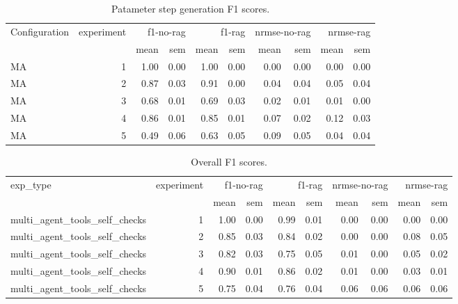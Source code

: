 \documentclass[sn-nature, twocolumn]{sn-jnl}%
\theoremstyle{thmstyleone}%
\theoremstyle{thmstyletwo}%
\theoremstyle{thmstylethree}%
\begin{document}
\begin{table}[!htb]
\begin{tabular}{lrrrrrrrrr}
\toprule
Configuration & experiment & \multicolumn{2}{r}{f1-no-rag} & \multicolumn{2}{r}{f1-rag} & \multicolumn{2}{r}{nrmse-no-rag} & \multicolumn{2}{r}{nrmse-rag} \\
 &  & mean & sem & mean & sem & mean & sem & mean & sem \\
\midrule
MA & 1 & 1.00 & 0.00 & 1.00 & 0.00 & 0.00 & 0.00 & 0.00 & 0.00 \\
MA & 2 & 0.87 & 0.03 & 0.91 & 0.00 & 0.04 & 0.04 & 0.05 & 0.04 \\
MA & 3 & 0.68 & 0.01 & 0.69 & 0.03 & 0.02 & 0.01 & 0.01 & 0.00 \\
MA & 4 & 0.86 & 0.01 & 0.85 & 0.01 & 0.07 & 0.02 & 0.12 & 0.03 \\
MA & 5 & 0.49 & 0.06 & 0.63 & 0.05 & 0.09 & 0.05 & 0.04 & 0.04 \\
\bottomrule
\end{tabular}
    \caption{Patameter step generation F1 scores.}
    \label{tab:placeholder}
\end{table}



\begin{table}[!htb]
\begin{tabular}{lrrrrrrrrr}
\toprule
exp\_type & experiment & \multicolumn{2}{r}{f1-no-rag} & \multicolumn{2}{r}{f1-rag} & \multicolumn{2}{r}{nrmse-no-rag} & \multicolumn{2}{r}{nrmse-rag} \\
 &  & mean & sem & mean & sem & mean & sem & mean & sem \\
\midrule
multi\_agent\_tools\_self\_checks & 1 & 1.00 & 0.00 & 0.99 & 0.01 & 0.00 & 0.00 & 0.00 & 0.00 \\
multi\_agent\_tools\_self\_checks & 2 & 0.85 & 0.03 & 0.84 & 0.02 & 0.00 & 0.00 & 0.08 & 0.05 \\
multi\_agent\_tools\_self\_checks & 3 & 0.82 & 0.03 & 0.75 & 0.05 & 0.01 & 0.00 & 0.05 & 0.02 \\
multi\_agent\_tools\_self\_checks & 4 & 0.90 & 0.01 & 0.86 & 0.02 & 0.01 & 0.00 & 0.03 & 0.01 \\
multi\_agent\_tools\_self\_checks & 5 & 0.75 & 0.04 & 0.76 & 0.04 & 0.06 & 0.06 & 0.06 & 0.06 \\
\bottomrule
\end{tabular}
    \caption{Overall F1 scores.}
    \label{tab:placeholder}
\end{table}
\end{document}
